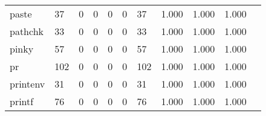 \begin{longtable}{lp{1.20cm}p{1.20cm}p{1.20cm}p{1.20cm}p{1.20cm}p{1.20cm}p{1.20cm}p{1.20cm}p{1.20cm}p{1.20cm}}
paste     &                                    37 &                                                  0 &                                                  0 &                                                  0 &                                                  0 &                                                 37 &                                         1.000 &                                              1.000 &                                              1.000 \\
pathchk   &                                    33 &                                                  0 &                                                  0 &                                                  0 &                                                  0 &                                                 33 &                                         1.000 &                                              1.000 &                                              1.000 \\
pinky     &                                    57 &                                                  0 &                                                  0 &                                                  0 &                                                  0 &                                                 57 &                                         1.000 &                                              1.000 &                                              1.000 \\
pr        &                                   102 &                                                  0 &                                                  0 &                                                  0 &                                                  0 &                                                102 &                                         1.000 &                                              1.000 &                                              1.000 \\
printenv  &                                    31 &                                                  0 &                                                  0 &                                                  0 &                                                  0 &                                                 31 &                                         1.000 &                                              1.000 &                                              1.000 \\
printf    &                                    76 &                                                  0 &                                                  0 &                                                  0 &                                                  0 &                                                 76 &                                         1.000 &                                              1.000 &                                              1.000 \\

\end{longtable}
